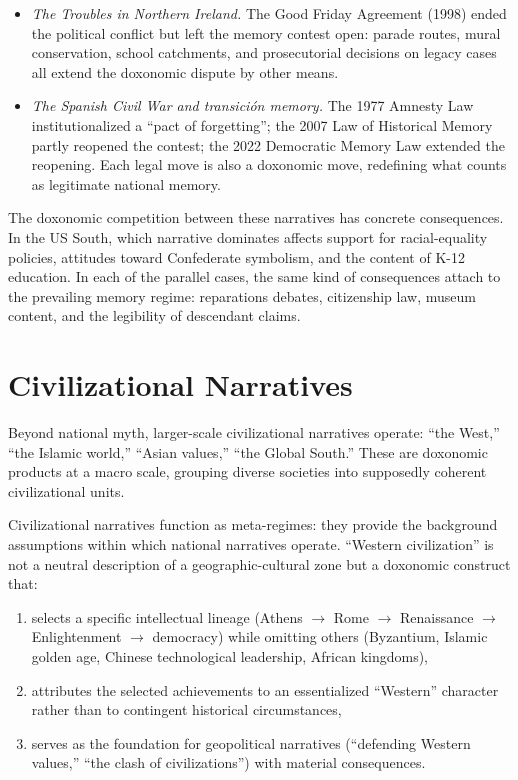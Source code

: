 \begin{example}
\begin{itemize}[nosep]
  \item \emph{The Troubles in Northern Ireland.} The Good Friday Agreement (1998) ended the political conflict but left the memory contest open: parade routes, mural conservation, school catchments, and prosecutorial decisions on legacy cases all extend the doxonomic dispute by other means.
  \item \emph{The Spanish Civil War and \emph{transici{\'o}n} memory.} The 1977 Amnesty Law institutionalized a ``pact of forgetting''; the 2007 Law of Historical Memory partly reopened the contest; the 2022 Democratic Memory Law extended the reopening. Each legal move is also a doxonomic move, redefining what counts as legitimate national memory.
\end{itemize}
The doxonomic competition between these narratives has concrete consequences. In the US South, which narrative dominates affects support for racial-equality policies, attitudes toward Confederate symbolism, and the content of K-12 education. In each of the parallel cases, the same kind of consequences attach to the prevailing memory regime: reparations debates, citizenship law, museum content, and the legibility of descendant claims.
\end{example}

\section{Civilizational Narratives}
\label{sec:ch27-civilization}

Beyond national myth, larger-scale civilizational narratives operate: ``the West,'' ``the Islamic world,'' ``Asian values,'' ``the Global South.''
These are doxonomic products at a macro scale, grouping diverse societies into supposedly coherent civilizational units.

\begin{proposition}
\label{prop:civilizational}
Civilizational narratives function as meta-regimes: they provide the background assumptions within which national narratives operate.
``Western civilization'' is not a neutral description of a geographic-cultural zone but a doxonomic construct that:
\begin{enumerate}[nosep]
  \item selects a specific intellectual lineage (Athens $\to$ Rome $\to$ Renaissance $\to$ Enlightenment $\to$ democracy) while omitting others (Byzantium, Islamic golden age, Chinese technological leadership, African kingdoms),
  \item attributes the selected achievements to an essentialized ``Western'' character rather than to contingent historical circumstances,
  \item serves as the foundation for geopolitical narratives (``defending Western values,'' ``the clash of civilizations'') with material consequences.
\end{enumerate}
\end{proposition}

